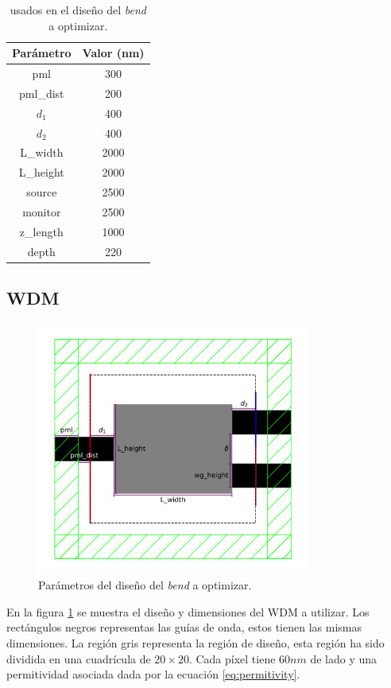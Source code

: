 \begin{table}[ht]
    \centering
    \begin{tabular}{|c|c|}
    \hline 
    Parámetro &  Valor (nm) \\
    \hline 
    pml & 300 \\
    pml\_dist & 200 \\
    $d_1$ & 400 \\
    $d_2$ & 400 \\
    L\_width & 2000 \\
    L\_height & 2000 \\
    source & 2500 \\
    monitor & 2500 \\
    z\_length & 1000 \\
    depth & 220 \\
    \hline 
    \end{tabular}
    \caption{ usados en el diseño del \emph{bend} a optimizar.}
    \label{tab:bend-values}
\end{table}

\subsection{WDM}

\begin{figure}[ht]
  \centering
  \includegraphics[width=0.8\textwidth]{image/proposal/wdm.png}
  \caption{Parámetros del diseño del \emph{bend} a optimizar.}
  \label{fig:dimensiones-demultiplexer}
\end{figure}

En la figura \ref{fig:dimensiones-demultiplexer} se muestra el diseño y dimensiones del WDM a utilizar.
Los rectángulos negros representas las guías de onda, estos tienen las mismas dimensiones.
La región gris representa la región de diseño, esta región ha sido dividida en una cuadrícula de $20 \times 20$.
Cada píxel tiene $60 nm$ de lado y una permitividad asociada dada por la ecuación \ref{eq:permitivity}.


